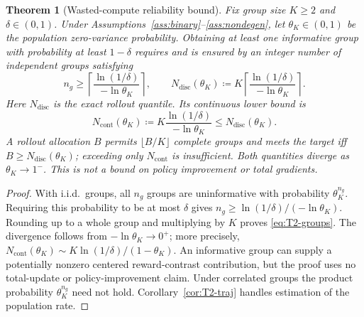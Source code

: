 \documentclass[11pt]{article}
\theoremstyle{plain}
\newtheorem{theorem}{Theorem}
\theoremstyle{definition}
\theoremstyle{remark}
\newcommand{\1}{\mathbb{1}}
\begin{document}
\begin{theorem}[Wasted-compute reliability bound]\label{thm:T2}
Fix group size $K\ge2$ and $\delta\in(0,1)$. Under
Assumptions~\ref{ass:binary}--\ref{ass:nondegen}, let $\theta_K\in(0,1)$
be the population zero-variance probability. Obtaining at least one
informative group with probability at least $1-\delta$ requires and is
ensured by an integer number of independent groups satisfying
\begin{equation}\label{eq:T2-groups}
n_g\ge\left\lceil\frac{\ln(1/\delta)}{-\ln\theta_K}\right\rceil,
\qquad
N_{\mathrm{disc}}(\theta_K)\coloneqq
K\left\lceil\frac{\ln(1/\delta)}{-\ln\theta_K}\right\rceil.
\end{equation}
Here $N_{\mathrm{disc}}$ is the exact rollout quantile. Its continuous lower
bound is
\[
N_{\mathrm{cont}}(\theta_K)\coloneqq
K\frac{\ln(1/\delta)}{-\ln\theta_K}\le N_{\mathrm{disc}}(\theta_K).
\]
A rollout allocation $B$ permits $\lfloor B/K\rfloor$ complete groups and
meets the target iff $B\ge N_{\mathrm{disc}}(\theta_K)$; exceeding only
$N_{\mathrm{cont}}$ is insufficient. Both quantities diverge as
$\theta_K\to1^-$. This is not a bound on policy improvement or total gradients.
\end{theorem}
\begin{proof}
With i.i.d.\ groups, all $n_g$ groups are uninformative with probability
$\theta_K^{n_g}$. Requiring this probability to be at most $\delta$ gives
$n_g\ge\ln(1/\delta)/(-\ln\theta_K)$. Rounding up to a whole group and
multiplying by $K$ proves \eqref{eq:T2-groups}. The divergence follows from
$-\ln\theta_K\to0^+$; more precisely,
$N_{\mathrm{cont}}(\theta_K)\sim K\ln(1/\delta)/(1-\theta_K)$.
An informative group can supply a potentially nonzero centered reward-contrast
contribution, but the proof uses no total-update or policy-improvement claim.
Under correlated groups the product probability $\theta_K^{n_g}$ need not
hold. Corollary~\ref{cor:T2-traj} handles estimation of the population rate.
\end{proof}
\end{document}
